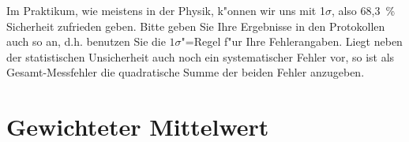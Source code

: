 %
%

Im Praktikum, wie meistens in der
Physik, k"onnen wir uns mit 1$\sigma$, also 68,3~\% Sicherheit zufrieden geben.
Bitte geben Sie Ihre Ergebnisse in den Protokollen auch so an,
d.h. benutzen Sie die $1\sigma$"=Regel f"ur Ihre Fehlerangaben.
Liegt neben der statistischen Unsicherheit auch noch ein
systematischer Fehler vor, so ist als Gesamt-Messfehler die quadratische Summe
der beiden Fehler anzugeben.
%


\section{Gewichteter Mittelwert}

